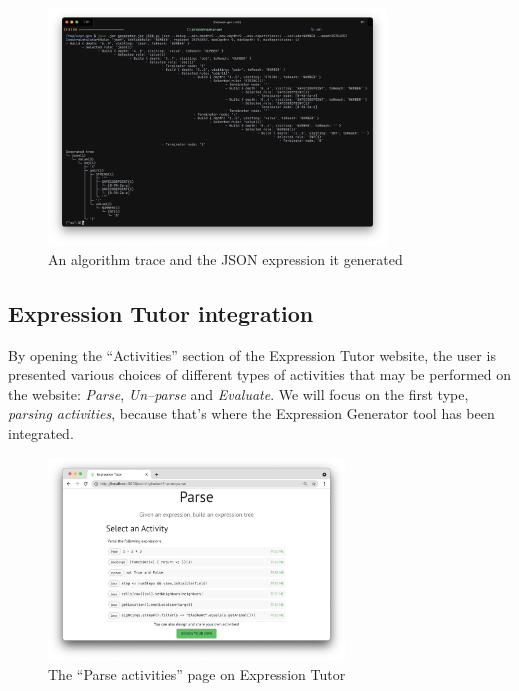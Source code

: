 \documentclass[]{usiinfbachelorproject}
\begin{document}
\begin{figure}[ht]
\centering
\includegraphics[width=0.8\textwidth]{img/validation/cli_step3.png}
\caption{An algorithm trace and the JSON expression it generated
}\label{validation-cli-3}
\end{figure}

\newpage %

\subsection{Expression Tutor integration}

By opening the ``Activities'' section of the Expression Tutor website,
the user is presented various choices of different types of activities that may
be performed on the website: \textit{Parse}, \textit{Un–parse} and
\textit{Evaluate}.
We will focus on the first type, \textit{parsing activities}, because that's
where the Expression Generator tool has been integrated.

\begin{figure}[ht]
\centering
\includegraphics[width=0.7\textwidth]{img/validation/web_tutor_step0.png}
\caption{The ``Parse activities'' page on Expression Tutor
}\label{validation-web-0}
\end{figure}
\end{document}
